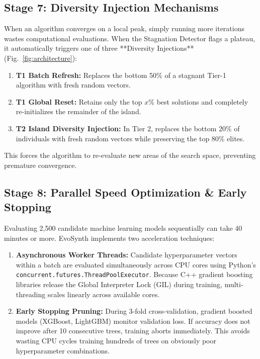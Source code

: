 \documentclass[conference]{IEEEtran}
\begin{document}
\subsection{Stage 7: Diversity Injection Mechanisms}
When an algorithm converges on a local peak, simply running more iterations wastes computational evaluations. When the Stagnation Detector flags a plateau, it automatically triggers one of three **Diversity Injections** (Fig.~\ref{fig:architecture}):
\begin{enumerate}
    \item \textbf{T1 Batch Refresh:} Replaces the bottom 50\% of a stagnant Tier-1 algorithm with fresh random vectors.
    \item \textbf{T1 Global Reset:} Retains only the top $x\%$ best solutions and completely re-initializes the remainder of the island.
    \item \textbf{T2 Island Diversity Injection:} In Tier 2, replaces the bottom 20\% of individuals with fresh random vectors while preserving the top 80\% elites.
\end{enumerate}
This forces the algorithm to re-evaluate new areas of the search space, preventing premature convergence.

\subsection{Stage 8: Parallel Speed Optimization & Early Stopping}
Evaluating 2,500 candidate machine learning models sequentially can take 40 minutes or more. EvoSynth implements two acceleration techniques:
\begin{enumerate}
    \item \textbf{Asynchronous Worker Threads:} Candidate hyperparameter vectors within a batch are evaluated simultaneously across CPU cores using Python's \texttt{concurrent.futures.ThreadPoolExecutor}. Because C++ gradient boosting libraries release the Global Interpreter Lock (GIL) during training, multi-threading scales linearly across available cores.
    \item \textbf{Early Stopping Pruning:} During 3-fold cross-validation, gradient boosted models (XGBoost, LightGBM) monitor validation loss. If accuracy does not improve after 10 consecutive trees, training aborts immediately. This avoids wasting CPU cycles training hundreds of trees on obviously poor hyperparameter combinations.
\end{enumerate}
\end{document}
